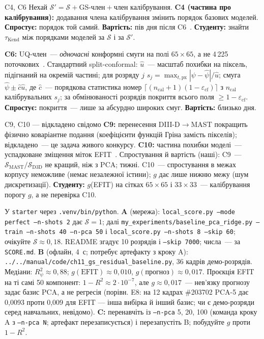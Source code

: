 \begin{conjecture}{C4, C6}
Нехай $\mathcal S'=\mathcal S+{}$GS-член${}+{}$член калібрування. \textbf{C4 (частина про калібрування):} додавання члена калібрування змінить порядок базових моделей. \textbf{Спростує:} порядок той самий. \textbf{Вартість:} пів дня після C6~\cite{ProjRegisters}. \textbf{Студенту:} знайти $\tau_{\mathrm{Kend}}$ між порядками моделей за $\mathcal S$ і за $\mathcal S'$.

\textbf{C6:} UQ-член~--- \emph{одночасні} конформні смуги на полі $65\times65$, а не 4\,225 поточкових~\cite{ProjRegisters}. Стандартний split-conformal: $\hat u$~--- масштаб похибки на піксель, підігнаний на окремій частині; для розряду $j$ $s_j=\max_{t,\mathrm{px}}|\psi-\hat\psi|/\hat u$; смуга $\hat\psi\pm\hat c\hat u$, де $\hat c$~--- порядкова статистика номер $\lceil(n_{\mathrm{cal}}+1)(1-\varepsilon_{\mathrm{cf}})\rceil$ з $n_{\mathrm{cal}}$ калібрувальних $s_j$; за обмінюваності розрядів покриття всього поля $\ge1-\varepsilon_{\mathrm{cf}}$. \textbf{Спростує:} покриття~--- лише за абсурдно широких смуг. \textbf{Вартість:} близько дня. 
\end{conjecture}

\begin{conjecture}{C9, C10 --- відкладено свідомо}
\textbf{C9:} перенесення DIII-D$\to$MAST покращить фізично коваріантне подання (коефіцієнти функцій Гріна замість пікселів); відкладено~--- це задача живого конкурсу. \textbf{C10:} частина похибки моделі~--- успадковане зміщення міток EFIT~\cite{ProjRegisters}. Спростування й вартість (наші): C9~--- $\mathcal S_{\mathrm{MAST}}/\mathcal S_{\mathrm{D3D}}$ не кращий, ніж з PCA; тижні. C10~--- спростування в межах корпусу неможливе (немає незалежної істини); $g$ дає лише нижню межу (шум дискретизації). \textbf{Студенту:} $g$(EFIT) на сітках $65\times65$ і $33\times33$~--- калібрування порогу $g$, а не перевірка C10.
\end{conjecture}

\begin{practicum}
У \texttt{starter} через \texttt{.venv/bin/python}. \textbf{A} (мережа): \texttt{local\_score.py --mode perfect --n-shots 2} дає $\mathcal S=1$; далі \texttt{my\_experiments/baseline\_pca\_ridge.py --train --n-shots 40 --n-pca 50} і \texttt{local\_score.py --n-shots 8 --skip 60}; очікуйте $\mathcal S\approx0{,}18$. README згадує 10 розрядів і \texttt{--skip 7000}; числа~--- за \texttt{SCORE.md}. \textbf{B} (офлайн, 4~с; потребує артефакту з кроку A): \texttt{../../manual/code/ch11\_gs\_residual\_baseline.py}, 36 кадрів демо-розрядів. Медіани: $R^2_\psi\approx0{,}88$; $g(\text{EFIT})\approx0{,}010$, $g(\text{прогноз})\approx0{,}017$. Проєкція EFIT на ті самі 50 компонент: $1-R^2\approx2\cdot10^{-7}$, але $g\approx0{,}017$~--- нев'язку прогнозу задає базис PCA, а не регресія (порівн. E8: на 12 кадрах \#203702 PCA-5 дає 0,0093 проти 0,009 для EFIT --- інша вибірка й інший базис; чи є демо-розряди серед навчальних, невідомо). \textbf{C:} перенавчіть із \texttt{--n-pca} 5, 20, 100 (команда кроку A з \texttt{--n-pca N}; артефакт перезаписується) і перезапустіть B; побудуйте $g$ проти $1-R^2$.
\end{practicum}

